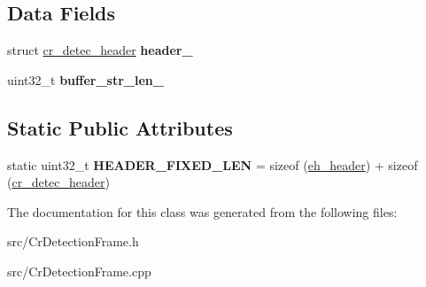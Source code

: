 \subsection*{Data Fields}
\begin{DoxyCompactItemize}
\item 
\hypertarget{classCrDetectionFrame_abef93a118f6acc3026a07a26dfebb66e}{struct \hyperlink{structcr__detec__header}{cr\-\_\-detec\-\_\-header} {\bfseries header\-\_\-}}\label{classCrDetectionFrame_abef93a118f6acc3026a07a26dfebb66e}

\item 
\hypertarget{classCrDetectionFrame_ae1f87912445fb16510d975071a561f0e}{uint32\-\_\-t {\bfseries buffer\-\_\-str\-\_\-len\-\_\-}}\label{classCrDetectionFrame_ae1f87912445fb16510d975071a561f0e}

\end{DoxyCompactItemize}
\subsection*{Static Public Attributes}
\begin{DoxyCompactItemize}
\item 
\hypertarget{classCrDetectionFrame_a5293e3726b046b7a076dc86910e26262}{static uint32\-\_\-t {\bfseries H\-E\-A\-D\-E\-R\-\_\-\-F\-I\-X\-E\-D\-\_\-\-L\-E\-N} = sizeof (\hyperlink{structeh__header}{eh\-\_\-header}) + sizeof (\hyperlink{structcr__detec__header}{cr\-\_\-detec\-\_\-header})}\label{classCrDetectionFrame_a5293e3726b046b7a076dc86910e26262}

\end{DoxyCompactItemize}


The documentation for this class was generated from the following files\-:\begin{DoxyCompactItemize}
\item 
src/Cr\-Detection\-Frame.\-h\item 
src/Cr\-Detection\-Frame.\-cpp\end{DoxyCompactItemize}
